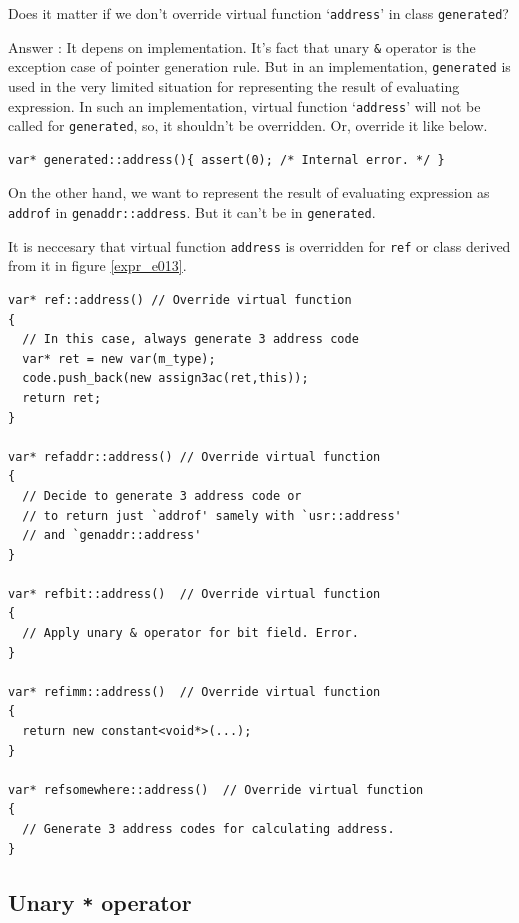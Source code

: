 \begin{QandA}
Does it matter if we don't override virtual function `{\tt{address}}' in
class {\tt{generated}}?

Answer : It depens on implementation. It's fact that
unary {\tt{\&}} operator is the exception case of pointer generation
 rule.
But in an implementation, {\tt{generated}} is used in the very limited
situation for representing the result of evaluating expression.
In such an implementation, virtual function `{\tt{address}}' will not
be called for {\tt{generated}}, so, it shouldn't be overridden.
Or, override it like below.
\begin{verbatim}
var* generated::address(){ assert(0); /* Internal error. */ } 
\end{verbatim}
On the other hand, we want to represent the result of evaluating expression
as {\tt{addrof}} in {\tt{genaddr::address}}.
 But it can't be in {\tt{generated}}.
\end{QandA}
It is neccesary that virtual function {\tt{address}} is overridden
for {\tt{ref}} or class derived from it in figure \ref{expr_e013}.
\begin{verbatim}
var* ref::address() // Override virtual function
{
  // In this case, always generate 3 address code
  var* ret = new var(m_type);
  code.push_back(new assign3ac(ret,this));
  return ret;
}

var* refaddr::address() // Override virtual function
{
  // Decide to generate 3 address code or
  // to return just `addrof' samely with `usr::address'
  // and `genaddr::address'
}

var* refbit::address()  // Override virtual function
{
  // Apply unary & operator for bit field. Error.
}

var* refimm::address()  // Override virtual function
{
  return new constant<void*>(...);
}

var* refsomewhere::address()  // Override virtual function
{
  // Generate 3 address codes for calculating address.
}
\end{verbatim}

\subsection{Unary {\tt{*}} operator}
\label{expr_e009}

